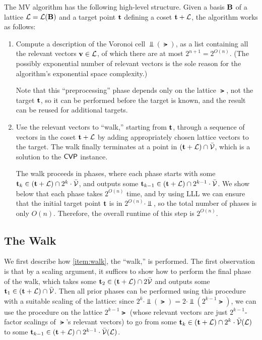 \documentclass[11pt]{article}
\begin{document}
The MV algorithm has the following high-level structure. Given a basis
$\mathbf{B}$ of a lattice $\mathcal{L} = \mathcal{L}(\mathbf{B})$ and a target point $\mathbf{t}$
defining a coset $\mathbf{t} + \mathcal{L}$, the algorithm works as follows:
\begin{enumerate}
\item Compute a description of the Voronoi cell $\Vbar(\lat)$, as a
  list containing all the relevant vectors $\mathbf{v} \in \mathcal{L}$, of which
  there are at most $2^{n+1} = 2^{O(n)}$. (The possibly exponential
  number of relevant vectors is the sole reason for the algorithm's
  exponential space complexity.)\label{item:compute-voronoi}

  Note that this ``preprocessing'' phase depends only on the lattice
  $\lat$, not the target $\mathbf{t}$, so it can be performed before the
  target is known, and the result can be reused for additional
  targets.

\item Use the relevant vectors to ``walk,'' starting from $\mathbf{t}$,
  through a sequence of vectors in the coset $\mathbf{t}+\mathcal{L}$ by adding
  appropriately chosen lattice vectors to the target. The walk finally
  terminates at a point in $(\mathbf{t}+\mathcal{L}) \cap \bar{\mathcal{V}}$, which is a
  solution to the $\mathsf{CVP}$ instance.\label{item:walk}

  The walk proceeds in phases, where each phase starts with some
  $\mathbf{t}_{k} \in (\mathbf{t}+\mathcal{L}) \cap 2^{k} \cdot \bar{\mathcal{V}}$, and outputs
  some $\mathbf{t}_{k-1} \in (\mathbf{t} + \mathcal{L}) \cap 2^{k-1} \cdot \bar{\mathcal{V}}$. We
  show below that each phase takes $2^{O(n)}$ time, and by using LLL
  we can ensure that the initial target point $\mathbf{t}$ is in
  $2^{O(n)} \cdot \Vbar$, so the total number of phases is only
  $O(n)$. Therefore, the overall runtime of this step is $2^{O(n)}$.
\end{enumerate}

\subsection{The Walk}
\label{sec:walk}

We first describe how \cref{item:walk}, the ``walk,'' is
performed. The first observation is that by a scaling argument, it
suffices to show how to perform the final phase of the walk, which
takes some $\mathbf{t}_{2} \in (\mathbf{t}+\mathcal{L}) \cap 2 \bar{\mathcal{V}}$ and outputs some
$\mathbf{t}_{1} \in (\mathbf{t}+\mathcal{L}) \cap \bar{\mathcal{V}}$. Then all prior phases can be
performed using this procedure with a suitable scaling of the lattice:
since $2^{k} \cdot \Vbar(\lat) = 2 \cdot \Vbar(2^{k-1} \lat)$, we can
use the procedure on the lattice $2^{k-1} \lat$ (whose relevant
vectors are just $2^{k-1}$-factor scalings of $\lat$'s relevant
vectors) to go from some
$\mathbf{t}_{k} \in (\mathbf{t}+\mathcal{L}) \cap 2^{k} \cdot \bar{\mathcal{V}}(\mathcal{L})$ to some
$\mathbf{t}_{k-1} \in (\mathbf{t}+\mathcal{L}) \cap 2^{k-1} \cdot \bar{\mathcal{V}}(\mathcal{L})$.
\end{document}
